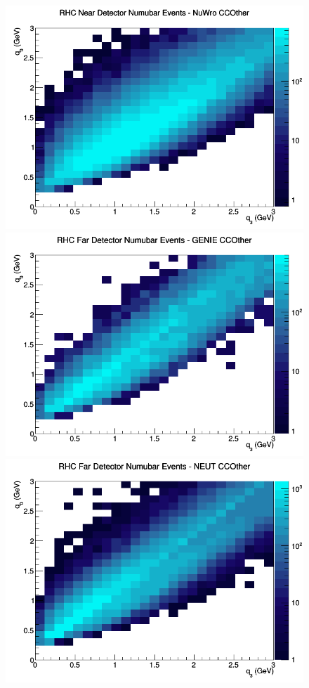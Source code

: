 \begin{figure}[h]
\includegraphics[width=\linewidth]{eff_q0_q3/LAr/CCOther_RHC_ND_numubar_q3_q0_NuWro.png}
\endminipage
\newline
{}
\includegraphics[width=\linewidth]{eff_q0_q3/LAr/CCOther_RHC_FD_numubar_q3_q0_GENIE.png}
\endminipage
{}
\includegraphics[width=\linewidth]{eff_q0_q3/LAr/CCOther_RHC_FD_numubar_q3_q0_NEUT.png}

\end{figure}
